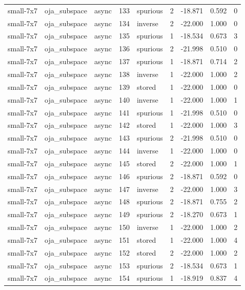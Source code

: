 \begin{tabular}{lllrlrrrr}
small-7x7 & oja\_subspace & async & 133 & spurious & 2 & -18.871 & 0.592 & 0 \\
small-7x7 & oja\_subspace & async & 134 & inverse & 2 & -22.000 & 1.000 & 0 \\
small-7x7 & oja\_subspace & async & 135 & spurious & 1 & -18.534 & 0.673 & 3 \\
small-7x7 & oja\_subspace & async & 136 & spurious & 2 & -21.998 & 0.510 & 0 \\
small-7x7 & oja\_subspace & async & 137 & spurious & 1 & -18.871 & 0.714 & 2 \\
small-7x7 & oja\_subspace & async & 138 & inverse & 1 & -22.000 & 1.000 & 2 \\
small-7x7 & oja\_subspace & async & 139 & stored & 1 & -22.000 & 1.000 & 0 \\
small-7x7 & oja\_subspace & async & 140 & inverse & 1 & -22.000 & 1.000 & 1 \\
small-7x7 & oja\_subspace & async & 141 & spurious & 1 & -21.998 & 0.510 & 0 \\
small-7x7 & oja\_subspace & async & 142 & stored & 1 & -22.000 & 1.000 & 3 \\
small-7x7 & oja\_subspace & async & 143 & spurious & 2 & -21.998 & 0.510 & 0 \\
small-7x7 & oja\_subspace & async & 144 & inverse & 1 & -22.000 & 1.000 & 0 \\
small-7x7 & oja\_subspace & async & 145 & stored & 2 & -22.000 & 1.000 & 1 \\
small-7x7 & oja\_subspace & async & 146 & spurious & 2 & -18.871 & 0.592 & 0 \\
small-7x7 & oja\_subspace & async & 147 & inverse & 2 & -22.000 & 1.000 & 3 \\
small-7x7 & oja\_subspace & async & 148 & spurious & 2 & -18.871 & 0.755 & 2 \\
small-7x7 & oja\_subspace & async & 149 & spurious & 2 & -18.270 & 0.673 & 1 \\
small-7x7 & oja\_subspace & async & 150 & inverse & 1 & -22.000 & 1.000 & 2 \\
small-7x7 & oja\_subspace & async & 151 & stored & 1 & -22.000 & 1.000 & 4 \\
small-7x7 & oja\_subspace & async & 152 & stored & 2 & -22.000 & 1.000 & 2 \\
small-7x7 & oja\_subspace & async & 153 & spurious & 2 & -18.534 & 0.673 & 1 \\
small-7x7 & oja\_subspace & async & 154 & spurious & 1 & -18.919 & 0.837 & 4 \\

\end{tabular}
